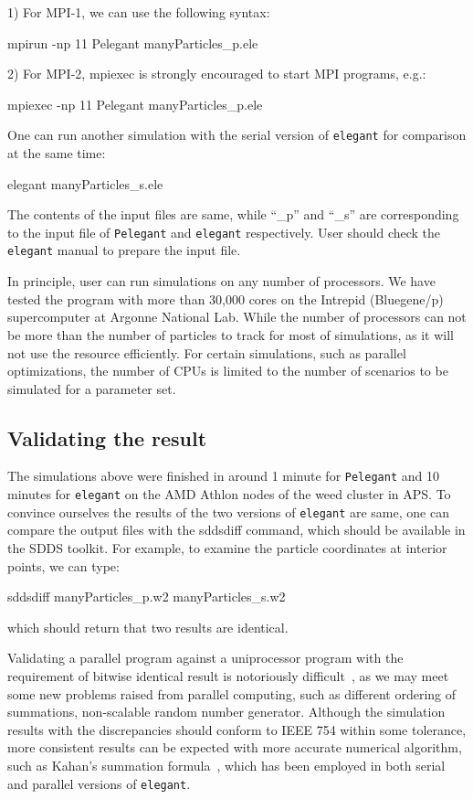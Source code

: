 \documentclass[11pt]{article}
\begin{document}
1) For MPI-1, we can use the following syntax:

\indent\indent mpirun -np 11 Pelegant manyParticles\_p.ele

2) For MPI-2, mpiexec is strongly encouraged to start MPI programs, e.g.:

\indent\indent mpiexec -np 11 Pelegant manyParticles\_p.ele


One can run another simulation with the serial version of {\tt elegant} for comparison at the same time:

\indent\indent elegant manyParticles\_s.ele
  
The contents of the input files are same, while ``\_p'' and ``\_s'' are corresponding
to the input file of {\tt Pelegant} and {\tt elegant} respectively. 
User should check the {\tt elegant} manual to prepare the input file. 
 
 
In principle, user can run simulations on any number of processors. We have
tested the program with more than 30,000 cores on the Intrepid (Bluegene/p) supercomputer  at Argonne National Lab.
While the number of processors can not be more than the number of particles to track for most of simulations, as it will not use the resource efficiently. For certain simulations, such as parallel optimizations, the number of CPUs is limited to the number of scenarios to be simulated for a parameter set.

 
 
\subsection {Validating the result} 
 
The simulations  above were finished in around 1 minute for {\tt Pelegant} and 10 
minutes for {\tt elegant} on the AMD Athlon nodes of the weed cluster in APS. 
To convince ourselves the results of the two 
versions of {\tt elegant} are same, one can compare the output files with the 
sddsdiff command, which should be available  in the SDDS toolkit.
 For example, to examine the particle coordinates at interior points, we can type: 
 
sddsdiff manyParticles\_p.w2 manyParticles\_s.w2 
 
\noindent which should return that two results are identical. 
 
Validating a parallel program against a uniprocessor program with the 
requirement of bitwise identical result is notoriously difficult~\cite{Gropp05}, as we 
may meet some new problems raised from parallel computing, such as different 
ordering of summations, non-scalable random number generator. Although the 
simulation results with the discrepancies should conform to IEEE 754 within 
some tolerance, more consistent results can be expected with more accurate 
numerical algorithm, such as Kahan's summation formula~\cite{Goldberg91}, which has been 
employed in both serial and parallel versions of {\tt elegant}. 
 
\end{document}
